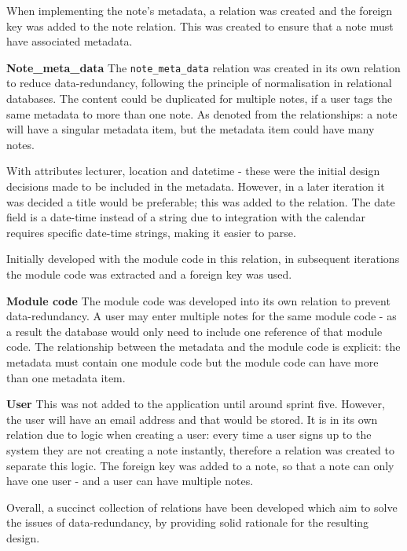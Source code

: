 When implementing the note's metadata, a relation was created and the foreign key was added to the note relation. This was created to ensure that a note must have associated metadata.

\noindent
\textbf{Note\_meta\_data}
\newline
The \texttt{note\_meta\_data} relation was created in its own relation to reduce data-redundancy, following the principle of normalisation in relational databases. The content could be duplicated for multiple notes, if a user tags the same metadata to more than one note. As denoted from the relationships: a note will have a singular metadata item, but the metadata item could have many notes.

With attributes lecturer, location and datetime - these were the initial design decisions made to be included in the metadata. However, in a later iteration it was decided a title would be preferable; this was added to the relation. The date field is a date-time instead of a string due to integration with the calendar requires specific date-time strings, making it easier to parse.

Initially developed with the module code in this relation, in subsequent iterations the module code was extracted and a foreign key was used.

\noindent
\textbf{Module code}
\newline
The module code was developed into its own relation to prevent data-redundancy. A user may enter multiple notes for the same module code - as a result the database would only need to include one reference of that module code. The relationship between the metadata and the module code is explicit: the metadata must contain one module code but the module code can have more than one metadata item.

\noindent
\textbf{User}
\newline
This was not added to the application until around sprint five. However, the user will have an email address and that would be stored. It is in its own relation due to logic when creating a user: every time a user signs up to the system they are not creating a note instantly, therefore a relation was created to separate this logic. The foreign key was added to a note, so that a note can only have one user - and a user can have multiple notes.


\noindent
Overall, a succinct collection of relations have been developed which aim to solve the issues of data-redundancy, by providing solid rationale for the resulting design.


